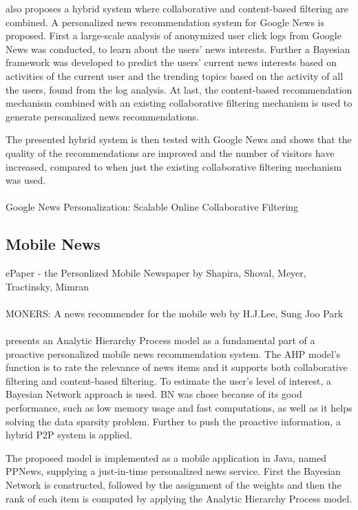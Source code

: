 \cite{liu2010personalized} also proposes a hybrid system where collaborative and content-based filtering are combined. A personalized news recommendation system for Google News is proposed. First a large-scale analysis of anonymized user click logs from Google News was conducted, to learn about the users' news interests. Further a Bayesian framework was developed to predict the users' current news interests based on activities of the current user and the trending topics based on the activity of all the users, found from the log analysis. At last, the content-based recommendation mechanism combined with an existing collaborative filtering mechanism is used to generate personalized news recommendations.

The presented hybrid system is then tested with Google News and shows that the quality of the recommendations are improved and the number of visitors have increased, compared to when just the existing collaborative filtering mechanism was used. \\\\
Google News Personalization: Scalable Online Collaborative Filtering

\subsection{Mobile News}
ePaper - the Personlized Mobile Newspaper by Shapira, Shoval, Meyer, Tractinsky, Mimran
\\\\
MONERS: A news recommender for the mobile web by H.J.Lee, Sung Joo Park
\\\\


\cite{yeung2010proactive} presents an Analytic Hierarchy Process\cite{saaty1988analytic} model as a fundamental part of a proactive personalized mobile news recommendation system. The AHP model's function is to rate the relevance of news items and it supports both collaborative filtering and content-based filtering. To estimate the user's level of interest, a Bayesian Network\cite{jensen1996introduction} approach is used. BN was chose because of its good performance, such as low memory usage and fast computations, as well as it helps solving the data sparsity problem. Further to push the proactive information, a hybrid P2P\cite{shen2010handbook} system is applied.

The proposed model is implemented as a mobile application in Java, named PPNews, supplying a just-in-time personalized news service. First the Bayesian Network is constructed, followed by the assignment of the weights and then the rank of each item is computed by applying the Analytic Hierarchy Process model.


